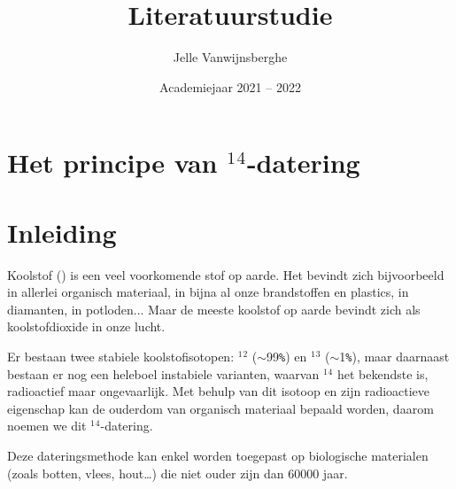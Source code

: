 \documentclass[kulak]{kulakarticle} %
\title{Literatuurstudie}
\author{Jelle Vanwijnsberghe}
\date{Academiejaar 2021 -- 2022}
\begin{document}
\maketitle

\section*{Het principe van $^1$$^4$-datering}

\section*{Inleiding}

Koolstof () is een veel voorkomende stof op aarde. Het bevindt zich bijvoorbeeld in allerlei organisch materiaal, in bijna al onze brandstoffen en plastics, in diamanten, in potloden... Maar de meeste koolstof op aarde bevindt zich als koolstofdioxide in onze lucht. 

Er bestaan twee stabiele koolstofisotopen: $^1$$^2$ ($\sim$\num{99}\verb|%|) en $^1$$^3$ ($\sim$\num{1}\verb|%|), maar daarnaast bestaan er nog een heleboel instabiele varianten, waarvan $^1$$^4$ het bekendste is, radioactief maar ongevaarlijk. Met behulp van dit isotoop en zijn radioactieve eigenschap kan de ouderdom van organisch materiaal bepaald worden, daarom noemen we dit $^1$$^4$-datering.

Deze dateringsmethode kan enkel worden toegepast op biologische materialen (zoals botten, vlees, hout…) die niet ouder zijn dan \num{60000} jaar. 
\end{document}
